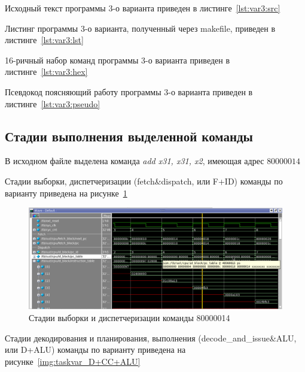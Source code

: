 Исходный текст программы 3-о варианта приведен в листинге~\ref{lst:var3:src}



Листинг программы 3-о варианта, полученный через makefile, приведен в листинге~\ref{lst:var3:lst}



16-ричный набор команд программы 3-о варианта приведен в листинге~\ref{lst:var3:hex}



Псевдокод поясняющий работу программы 3-о варианта приведен в листинге~\ref{lst:var3:pseudo}


\clearpage

\subsection{Стадии выполнения выделенной команды}

В исходном файле выделена команда \textit{add x31, x31, x2}, имеющая адрес $80000014$

Стадии выборки, диспетчеризации (fetch\&dispatch, или F+ID) команды по варианту приведена на рисунке~\ref{img:taskvar_F+ID}

\begin{figure}[H]
	\centering
	\includegraphics[width=1\textwidth]{images/taskvar_F+ID.png}
	\caption{Стадии выборки и диспетчеризации команды 80000014}
	\label{img:taskvar_F+ID}
\end{figure}

Стадии декодирования и планирования, выполнения (decode\_and\_issue\&ALU, или D+ALU) команды по варианту приведена на рисунке~\ref{img:taskvar_D+CC+ALU}

